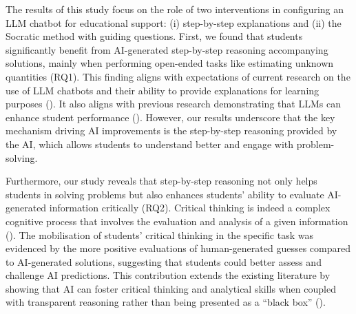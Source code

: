 \documentclass[
  11pt,
]{article}
\begin{document}
The results of this study focus on the role of two interventions in configuring an LLM chatbot for educational support: (i) step-by-step explanations and (ii) the Socratic method with guiding questions. First, we found that students significantly benefit from AI-generated step-by-step reasoning accompanying solutions, mainly when performing open-ended tasks like estimating unknown quantities (RQ1). This finding aligns with expectations of current research on the use of LLM chatbots and their ability to provide explanations for learning purposes (). It also aligns with previous research demonstrating that LLMs can enhance student performance (). However, our results underscore that the key mechanism driving AI improvements is the step-by-step reasoning provided by the AI, which allows students to understand better and engage with problem-solving.

Furthermore, our study reveals that step-by-step reasoning not only helps students in solving problems but also enhances students' ability to evaluate AI-generated information critically (RQ2). Critical thinking is indeed a complex cognitive process that involves the evaluation and analysis of a given information (). The mobilisation of students' critical thinking in the specific task was evidenced by the more positive evaluations of human-generated guesses compared to AI-generated solutions, suggesting that students could better assess and challenge AI predictions. This contribution extends the existing literature by showing that AI can foster critical thinking and analytical skills when coupled with transparent reasoning rather than being presented as a ``black box'' ().
\end{document}
